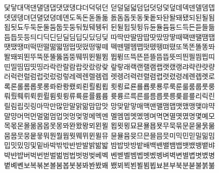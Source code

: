 닻닿대댁댄댈댐댑댓댔댕댜더덕덖던 덛덜덞덟덤덥덧덩덫덮데덱덴델뎀뎁 \\

뎃뎄뎅뎌뎐뎔뎠뎡뎨뎬도독돈돋돌돎 돐돔돕돗동돛돝돠돤돨돼됐되된될됨 \\



됩됫됴두둑둔둘둠둡둣둥둬뒀뒈뒝뒤 뒨뒬뒵뒷뒹듀듄듈듐듕드득든듣들듦 \\

듬듭듯등듸디딕딘딛딜딤딥딧딨딩딪 따딱딴딸땀땁땃땄땅땋때땍땐땔땜땝 \\

땟땠땡떠떡떤떨떪떫떰떱떳떴떵떻떼 떽뗀뗄뗌뗍떳뗐뗑뗘뗬또똑똔똘똥똬 \\

똴뙈뙤뙨뚜뚝뚠뚤뚫뚬뚱뛔뛰뛴뛸뜀 뜁뜅뜨뜩뜬뜯뜰뜸뜹뜻띄띈띌띔띕띠 \\

띤띨띰띱띳띵라락란랄람랍랏랐랑랒 랖랗래랙랜랠램랩랫랬랭랴략랸럇량 \\

러럭런럴럼럽럿렀렁렇레렉렌렐렘렙 렛렝려력련렬렴렵렷렸령례롄롑롓로 \\

록론롤롬롭롯롱롸롼뢍뢨뢰뢴뢸룀룁 룃룅료룐룔룝룟룡루룩룬룰룸룹룻룽 \\

뤄뤘뤠뤼뤽륀륄륌륏륑류륙륜률륨륩 륫륭르륵른를름릅릇릉릊릍릎리릭린 \\



릴림립릿링마막만많맏말맑맒맘맙맛 망맞맡맣매맥맨맬맴맵맷맸맹맺먀먁 \\

먈먕머먹먼멀멂멈멉멋멍멎멓메멕멘 멜멤멥멧멨멩며멱면멸몃몄명몇몌모 \\

목몫몬몰몲몸몹못몽뫄뫈뫘뫙뫼묀묄 묍묏묑묘묜묠묩묫무묵묶문묻물묽묾 \\

뭄뭅뭇뭉뭍뭏뭐뭔뭘뭡뭣뭬뮈뮌뮐뮤 뮨뮬뮴뮷므믄믈믐믓미믹민믿밀밂밈 \\

밉밋밌밍및밑바박밖밗반받발밝밞밟 밤밥밧방밭배백밴밸뱀뱁뱃뱄뱅뱉뱌 \\

뱍뱐뱝버벅번벋벌벎범법벗벙벚베벡 벤벧벨벰벱벳벴벵벼벽변별볍볏볐병 \\

볕볘볜보복볶본볼봄봅봇봉봐봔봤봬 뵀뵈뵉뵌뵐뵘뵙뵤뵨부북분붇불붉붊 \\

